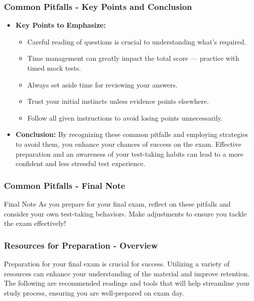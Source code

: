 \documentclass{beamer}
\begin{document}
\begin{frame}[fragile]
    \frametitle{Common Pitfalls - Key Points and Conclusion}
    \begin{itemize}
        \item \textbf{Key Points to Emphasize:}
        \begin{itemize}
            \item Careful reading of questions is crucial to understanding what's required.
            \item Time management can greatly impact the total score — practice with timed mock tests.
            \item Always set aside time for reviewing your answers.
            \item Trust your initial instincts unless evidence points elsewhere.
            \item Follow all given instructions to avoid losing points unnecessarily.
        \end{itemize}
        
        \item \textbf{Conclusion:}
        By recognizing these common pitfalls and employing strategies to avoid them, you enhance your chances of success on the exam. Effective preparation and an awareness of your test-taking habits can lead to a more confident and less stressful test experience.
    \end{itemize}
\end{frame}

\begin{frame}[fragile]
    \frametitle{Common Pitfalls - Final Note}
    \begin{block}{Final Note}
        As you prepare for your final exam, reflect on these pitfalls and consider your own test-taking behaviors. 
        Make adjustments to ensure you tackle the exam effectively!
    \end{block}
\end{frame}

\begin{frame}[fragile]
    \frametitle{Resources for Preparation - Overview}
    Preparation for your final exam is crucial for success. Utilizing a variety of resources can enhance your understanding of the material and improve retention. The following are recommended readings and tools that will help streamline your study process, ensuring you are well-prepared on exam day.
\end{frame}
\end{document}
